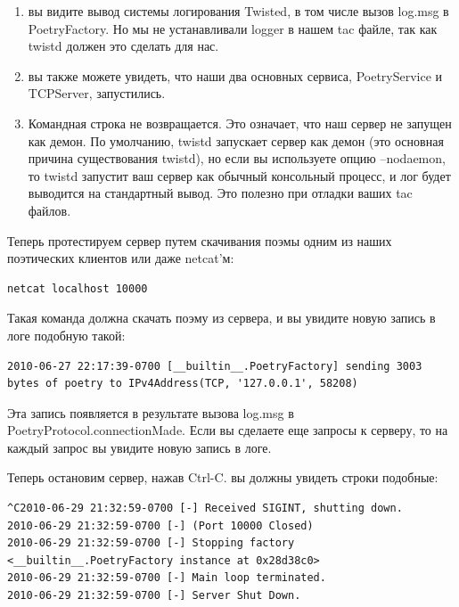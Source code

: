 \begin{enumerate}

\item вы видите вывод системы логирования Twisted, в том числе вызов 
log.msg в PoetryFactory. Но мы не устанавливали logger в нашем tac 
файле, так как twistd должен это сделать для нас.  

\item вы также можете увидеть, что наши два основных сервиса, PoetryService и TCPServer,
запустились.

\item Командная строка не возвращается. Это означает, что наш сервер 
не запущен как демон. По умолчанию, twistd запускает сервер как демон (это 
основная причина существования twistd), но если вы используете опцию 
--nodaemon, то twistd запустит ваш сервер как обычный консольный процесс, и 
лог будет выводится на стандартный вывод. Это полезно при отладки ваших 
tac файлов.

\end{enumerate}


Теперь протестируем сервер путем скачивания поэмы одним из 
наших поэтических клиентов или даже netcat'м:

\begin{scriptsize}\begin{verbatim}
netcat localhost 10000
\end{verbatim}\end{scriptsize}

Такая команда должна скачать поэму из сервера, и вы 
увидите новую запись в логе подобную такой: 

\begin{scriptsize}\begin{verbatim}
2010-06-27 22:17:39-0700 [__builtin__.PoetryFactory] sending 3003 bytes of poetry to IPv4Address(TCP, '127.0.0.1', 58208)
\end{verbatim}\end{scriptsize}


Эта запись появляется в результате вызова log.msg в 
PoetryProtocol.connectionMade. Если вы сделаете еще запросы к 
серверу, то на каждый запрос вы увидите новую запись в логе.


Теперь остановим сервер, нажав Ctrl-C. вы должны увидеть строки подобные:

\begin{scriptsize}\begin{verbatim}
^C2010-06-29 21:32:59-0700 [-] Received SIGINT, shutting down.
2010-06-29 21:32:59-0700 [-] (Port 10000 Closed)
2010-06-29 21:32:59-0700 [-] Stopping factory <__builtin__.PoetryFactory instance at 0x28d38c0>
2010-06-29 21:32:59-0700 [-] Main loop terminated.
2010-06-29 21:32:59-0700 [-] Server Shut Down.
\end{verbatim}\end{scriptsize}



